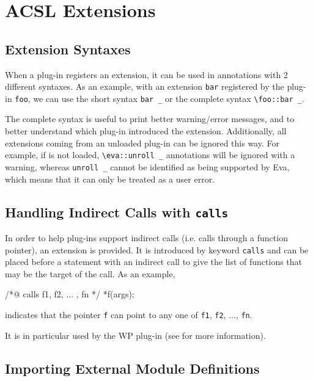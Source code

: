 \chapter{ACSL Extensions} %
\label{cha:acsl-extensions}
\section{Extension Syntaxes}
\label{acsl:syntax}

When a plug-in registers an extension, it can be used in \acsl annotations
with 2 different syntaxes. As an example, with an extension \lstinline|bar|
registered by the plug-in \lstinline|foo|, we can use the short syntax
\lstinline|bar _| or the complete syntax \lstinline|\foo::bar _|.

The complete syntax is useful to print better warning/error messages, and to
better understand which plug-in introduced the extension. Additionally, all
extensions coming from an unloaded plug-in can be ignored this way. For
example, if \Eva is not loaded, \lstinline|\eva::unroll _| annotations will be
ignored with a warning, whereas \lstinline|unroll _| cannot be identified as
being supported by Eva, which means that it can only be treated as a user
error.

\section{Handling Indirect Calls with \texttt{calls}}
\label{acsl:calls}

In order to help plug-ins support indirect calls (i.e. calls through
a function pointer), an \acsl extension is provided. It is introduced
by keyword \lstinline|calls| and can be placed before
a statement with an indirect call to give the list of
functions that may be the target of the call. As an example,
\begin{ccode}
/*@ calls f1, f2, ... , fn */
*f(args);
\end{ccode}
indicates that the pointer \lstinline|f| can point to any one of
\lstinline|f1|, \lstinline|f2|, ..., \lstinline|fn|.

It is in particular used by the WP plug-in (see \cite{wp} for more information).

\section{Importing External Module Definitions}
\label{acsl:modules}


